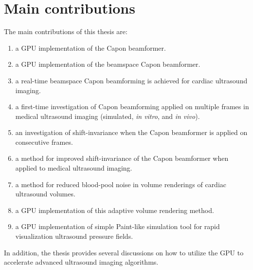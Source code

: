 \section{Main contributions}
The main contributions of this thesis are:
\begin{enumerate}
\item a GPU implementation of the Capon beamformer.
\item a GPU implementation of the beamspace Capon beamformer.
\item a real-time beamspace Capon beamforming is achieved for cardiac ultrasound imaging.
\item a first-time investigation of Capon beamforming applied on multiple frames in medical ultrasound imaging (simulated, \textit{in vitro}, and \textit{in vivo}).
\item an investigation of shift-invariance when the Capon beamformer is applied on consecutive frames.
\item a method for improved shift-invariance of the Capon beamformer when applied to medical ultrasound imaging.
\item a method for reduced blood-pool noise in volume renderings of cardiac ultrasound volumes.
\item a GPU implementation of this adaptive volume rendering method.
\item a GPU implementation of simple Paint-like simulation tool for rapid visualization ultrasound pressure fields.
\end{enumerate}
In addition, the thesis provides several discussions on how to utilize the GPU to accelerate advanced ultrasound imaging algorithms. 

